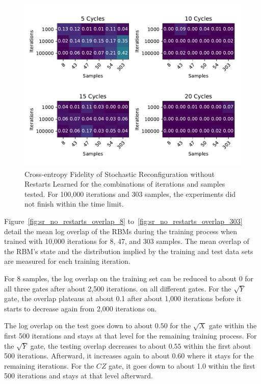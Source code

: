\begin{figure}[H]
  \centering
  \includegraphics[width=\textwidth]{figures/results/SR-no-restarts-learned/fxeb_heatmap.pdf}
  \caption[Cross-entropy Fidelity of Stochastic Reconfiguration without Restarts Learned]{Cross-entropy Fidelity of Stochastic 
  Reconfiguration without Restarts Learned for the combinations of iterations and samples tested.
  For 100,000 iterations and 303 samples, the experiments did not finish within the time limit.}
  \label{fig:sr_no_restarts_fxeb}
\end{figure}

Figure~\ref{fig:sr_no_restarts_overlap_8} to~\ref{fig:sr_no_restarts_overlap_303} detail the mean log overlap of the RBMs during the 
training process when trained with 10,000 iterations for 8, 47, and 303 samples. The 
mean overlap of the RBM's state and the distribution implied by the training and test data sets are measured 
for each training iteration.

For 8 samples, the log overlap on the training set can be reduced to about 0 for all three gates after about 2,500 iterations.
on all different gates. For the $\sqrt{Y}$ gate, the overlap plateaus at about 0.1 after about 1,000 iterations before it starts 
to decrease again from 2,000 iterations on. 

The log overlap on the test goes down to about $0.50$ for the $\sqrt{X}$ gate within the first 500 iterations and stays at 
that level for the remaining training process. For the $\sqrt{Y}$ gate, the testing overlap decreases to about 
$0.55$ within the first about 500 iterations. Afterward, it increases again to about 0.60 where it stays for the 
remaining iterations. For the $CZ$ gate, it goes down to about 1.0 within the first 500 iterations and stays at 
that level afterward.


